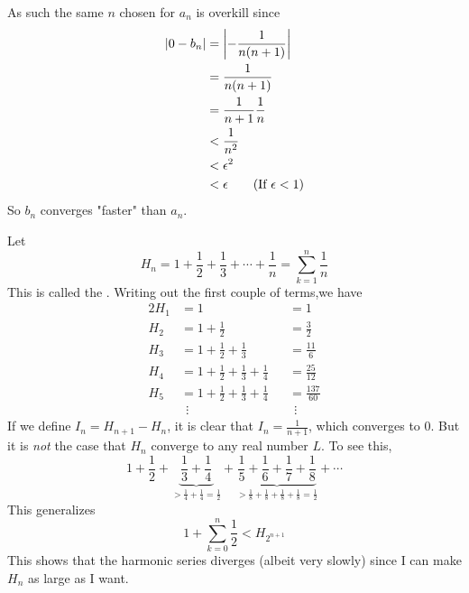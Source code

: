 \begin{example}
    As such the same \( n \) chosen for \( a_{n} \) is overkill since 
    \begin{align*}
        \abs{0 - b_{n}} &= \abs{-\frac{1}{n(n+1)}} \\
        &= \frac{1}{n(n+1)} \\
        &= \frac{1}{n+1} \frac{1}{n} \\
        & < \frac{1}{n^{2}}\\
        & < \epsilon^{2} \\
        &< \epsilon \tag{If $\epsilon < 1$}
    \end{align*}
    So \( b_{n} \) converges "faster" than \( a_{n} \).
\end{example}

\begin{example}
    Let 
    \[ H_{n} = 1 + \frac{1}{2} + \frac{1}{3} + \cdots + \frac{1}{n} = \sum_{k=1}^{n} \frac{1}{n}  \]
    This is called the . 
    Writing out the first couple of terms,we have 
  \begin{alignat*}{2}
    H_{1} &= 1 \qquad & &= 1 \\
    H_{2} &= 1 + \frac{1}{2} & &= \frac{3}{2} \\
    H_{3} &= 1 + \frac{1}{2} + \frac{1}{3} & &= \frac{11}{6} \\
    H_{4} &=  1 + \frac{1}{2} + \frac{1}{3} + \frac{1}{4} & &= \frac{25}{12} \\
    H_{5} &= 1 + \frac{1}{2} + \frac{1}{3} + \frac{1}{4}  & &= \frac{137}{60} \\
    & \ \ \vdots & & \ \ \vdots
\end{alignat*}
    If we define \( I_{n}= H_{n+1}-H_{n} \), it is clear that \( I_{n} = \frac{1}{n+1} \), which converges to \( 0 \). But it is \emph{not} the case that \( H_{n} \) converge to any real number \( L \). To see this, 
    \[ 1 + \frac{1}{2} + \underbrace{\frac{1}{3} + \frac{1}{4}}_{\displaystyle >  \frac{1}{4} + \frac{1}{4} = \frac{1}{2}} + \underbrace{ \frac{1}{5} + \frac{1}{6} + \frac{1}{7} + \frac{1}{8}}_{\displaystyle > \frac{1}{8} + \frac{1}{8} + \frac{1}{8} + \frac{1}{8} = \frac{1}{2}} + \cdots \]
    This generalizes 
    \[ 1 + \sum_{k=0}^{n} \frac{1}{2} < H_{2^{n+1}} \]
    This shows that the harmonic series diverges (albeit very slowly) since I can make \( H_{n} \) as large as I want.
\end{example}

